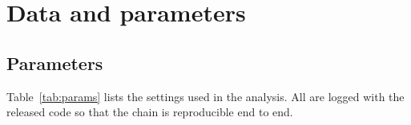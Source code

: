 \appendix
\renewcommand{\thefigure}{S\arabic{figure}}
\renewcommand{\theHfigure}{S\arabic{figure}}
\setcounter{figure}{0}
\renewcommand{\thetable}{S\arabic{table}}
\renewcommand{\theHtable}{S\arabic{table}}
\setcounter{table}{0}
\section{Data and parameters}
\label{app:data}


\subsection{Parameters}
\label{app:params}
Table~\ref{tab:params} lists the settings used in the analysis. All are logged with
the released code so that the chain is reproducible end to end.

